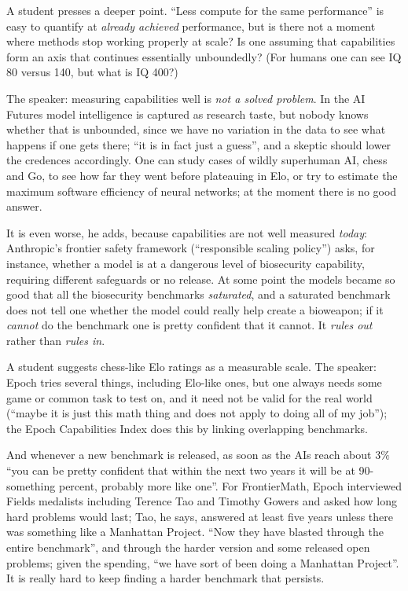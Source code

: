 \begin{discussion}
A student presses a deeper point. ``Less compute for the same performance'' is easy to quantify at \emph{already achieved} performance, but is there not a moment where methods stop working properly at scale? Is one assuming that capabilities form an axis that continues essentially unboundedly? (For humans one can see IQ 80 versus 140, but what is IQ 400?)


The speaker: measuring capabilities well is \emph{not a solved problem}. In the AI Futures model intelligence is captured as research taste, but nobody knows whether that is unbounded, since we have no variation in the data to see what happens if one gets there; ``it is in fact just a guess'', and a skeptic should lower the credences accordingly. One can study cases of wildly superhuman AI, chess and Go, to see how far they went before plateauing in Elo, or try to estimate the maximum software efficiency of neural networks; at the moment there is no good answer. 

It is even worse, he adds, because capabilities are not well measured \emph{today}: Anthropic's frontier safety framework (``responsible scaling policy'') asks, for instance, whether a model is at a dangerous level of biosecurity capability, requiring different safeguards or no release. At some point the models became so good that all the biosecurity benchmarks \emph{saturated}, and a saturated benchmark does not tell one whether the model could really help create a bioweapon; if it \emph{cannot} do the benchmark one is pretty confident that it cannot. It \emph{rules out} rather than \emph{rules in}.


A student suggests chess-like Elo ratings as a measurable scale. The speaker: Epoch tries several things, including Elo-like ones, but one always needs some game or common task to test on, and it need not be valid for the real world (``maybe it is just this math thing and does not apply to doing all of my job''); the Epoch Capabilities Index does this by linking overlapping benchmarks. 

And whenever a new benchmark is released, as soon as the AIs reach about $3\%$ ``you can be pretty confident that within the next two years it will be at 90-something percent, probably more like one''. For FrontierMath, Epoch interviewed Fields medalists including Terence Tao and Timothy Gowers and asked how long hard problems would last; Tao, he says, answered at least five years unless there was something like a Manhattan Project. ``Now they have blasted through the entire benchmark'', and through the harder version and some released open problems; given the spending, ``we have sort of been doing a Manhattan Project''. It is really hard to keep finding a harder benchmark that persists.
\end{discussion}


